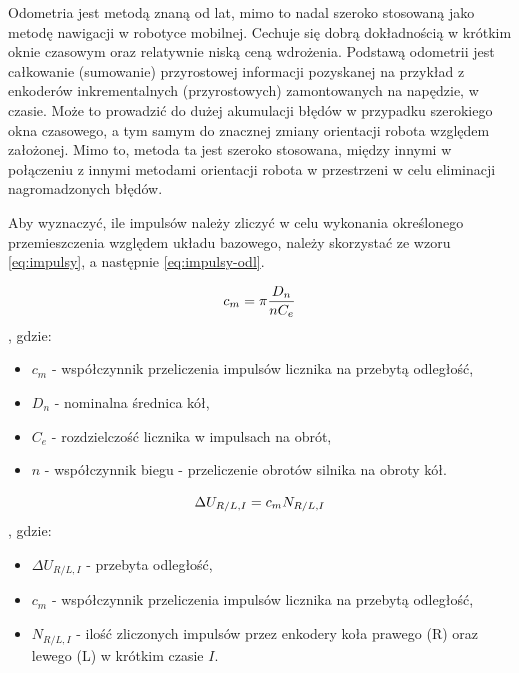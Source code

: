 Odometria jest metodą znaną od lat, mimo to nadal szeroko stosowaną jako metodę nawigacji w robotyce mobilnej. Cechuje się dobrą dokładnością w krótkim oknie czasowym oraz relatywnie niską ceną wdrożenia. Podstawą odometrii jest całkowanie (sumowanie) przyrostowej informacji pozyskanej na przykład z enkoderów inkrementalnych (przyrostowych) zamontowanych na napędzie, w czasie. Może to prowadzić do dużej akumulacji błędów w przypadku szerokiego okna czasowego, a tym samym do znacznej zmiany orientacji robota względem założonej. Mimo to, metoda ta jest szeroko stosowana, między innymi w połączeniu z innymi metodami orientacji  robota w przestrzeni w celu eliminacji nagromadzonych błędów. 

\hspace{1cm}

Aby wyznaczyć, ile impulsów należy zliczyć w celu wykonania określonego przemieszczenia względem układu bazowego, należy skorzystać ze wzoru \ref{eq:impulsy}, a następnie \ref{eq:impulsy-odl}.

\begin{equation}
    \centering
    c_m = \pi \frac{D_n}{n C_e}
    \label{eq:impulsy}
\end{equation}
, gdzie:
\begin{itemize}
    \item \(c_m\) - współczynnik przeliczenia impulsów licznika na przebytą odległość,
    \item \(D_n\) - nominalna średnica kół,
    \item \(C_e\) - rozdzielczość licznika w impulsach na obrót,
    \item \(n\) - współczynnik biegu - przeliczenie obrotów silnika na obroty kół.
\end{itemize}

\begin{equation}
    \centering
    \Delta U_{R/L, I} = c_m N_{R/L, I}
    \label{eq:impulsy-odl}
\end{equation}
, gdzie:
\begin{itemize}
    \item \(\Delta U_{R/L, I}\) - przebyta odległość,
    \item \(c_m\) -  współczynnik przeliczenia impulsów licznika na przebytą odległość,
    \item \(N_{R/L, I}\) - ilość zliczonych impulsów przez enkodery koła prawego (R) oraz lewego (L) w krótkim czasie \(I\). 
\end{itemize}

\clearpage

